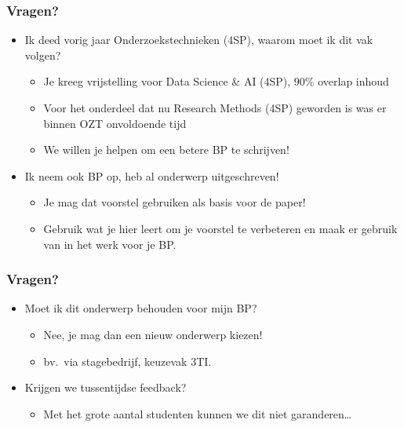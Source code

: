 \documentclass[aspectratio=169]{beamer}
\begin{document}
\begin{frame}
  \frametitle{Vragen?}

  \begin{itemize}
    \item Ik deed vorig jaar Onderzoekstechnieken (4SP), waarom moet ik dit vak volgen?
      \begin{itemize}
        \item Je kreeg vrijstelling voor Data Science \& AI (4SP), 90\% overlap inhoud
        \item Voor het onderdeel dat nu Research Methods (4SP) geworden is was er binnen OZT onvoldoende tijd
        \item We willen je helpen om een betere BP te schrijven!
      \end{itemize}
      \item Ik neem ook BP op, heb al onderwerp uitgeschreven!
      \begin{itemize}
        \item Je mag dat voorstel gebruiken als basis voor de paper!
        \item Gebruik wat je hier leert om je voorstel te verbeteren en maak er gebruik van in het werk voor je BP.
      \end{itemize}
    \end{itemize}

  \end{frame}
  
  \begin{frame}
    \frametitle{Vragen?}
  
    \begin{itemize}
      \item Moet ik dit onderwerp behouden voor mijn BP?
      \begin{itemize}
        \item Nee, je mag dan een nieuw onderwerp kiezen!
        \item bv.\ via stagebedrijf, keuzevak 3TI.
      \end{itemize}
    \item Krijgen we tussentijdse feedback?
      \begin{itemize}
        \item Met het grote aantal studenten kunnen we dit niet garanderen\ldots
      \end{itemize}
  \end{itemize}

\end{frame}
\end{document}

